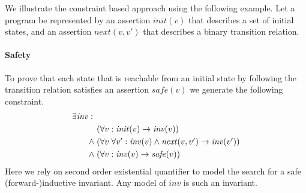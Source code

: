 \documentclass{new_tlp}
\newcommand{\limp}{\rightarrow}
\newcommand{\init}{\mathit{init}}
\newcommand{\next}{\mathit{next}}
\newcommand{\safe}{\mathit{safe}}
\newcommand{\inv}{\mathit{inv}}
\begin{document}
We illustrate the constraint based approach using the following example.
Let a program be represented by an assertion $\init(v)$ that describes
a set of initial states, and an assertion $\next(v, v')$ that
describes a binary transition relation.



\paragraph{Safety}

To prove that each state that is reachable from an initial state by
following the transition relation satisfies an assertion $\safe(v)$ we
generate the following constraint.
\begin{equation*}
  \begin{array}[t]{@{}l@{}}
    \exists \inv: \\[\jot]
    \qquad
    \begin{array}[t]{@{}l@{\;}l@{}}
      & (\forall v: \init(v) \limp \inv(v)) \\[\jot]
      \land & 
      (\forall v\; \forall v': \inv(v) \land \next(v, v') \limp \inv(v')) \\[\jot]
      \land & 
      (\forall v: \inv(v) \limp \safe(v))
    \end{array}
  \end{array}
\end{equation*}
Here we rely on second order existential quantifier to model the
search for a safe (forward-)inductive  invariant.
Any model of $\inv$ is such an invariant.
\end{document}
